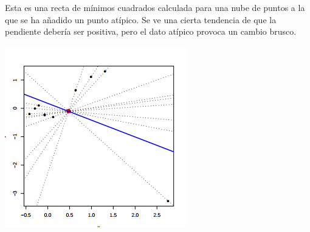 \begin{example}

Esta es una recta de mínimos cuadrados calculada para una nube de puntos a la que se ha añadido un punto atípico. Se ve una cierta tendencia de que la pendiente debería ser positiva, pero el dato atípico provoca un cambio brusco.
\begin{center}
\includegraphics[scale=0.9]{img/rmc_atipico2.png}
\end{center}

\end{example}

